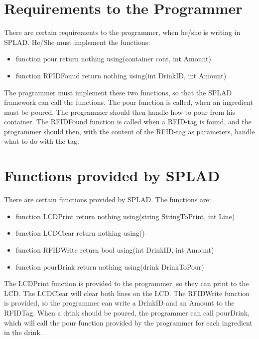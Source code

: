 \section{Requirements to the Programmer}
There are certain requirements to the programmer, when he/she is writing in SPLAD. He/She must implement the functions:
\begin{itemize}
	\item {\color[rgb]{0,0,1}function} pour {\color[rgb]{0,0,1}return} {\color[rgb]{0.545,0.133,0.133}nothing} {\color[rgb]{0,0,1}using}({\color[rgb]{0.545,0.133,0.133}container} cont, {\color[rgb]{0.545,0.133,0.133}int} Amount)
	\item {\color[rgb]{0,0,1}function} RFIDFound {\color[rgb]{0,0,1}return} {\color[rgb]{0.545,0.133,0.133}nothing} {\color[rgb]{0,0,1}using}({\color[rgb]{0.545,0.133,0.133}int} DrinkID, {\color[rgb]{0.545,0.133,0.133}int} Amount)
\end{itemize}
The programmer must implement these two functions, so that the SPLAD framework can call the functions. The pour function is called, when an ingredient must be poured. The programmer should then handle how to pour from his container.
The RFIDFound function is called when a RFID-tag is found, and the programmer should then, with the content of the RFID-tag as parameters, handle what to do with the tag.

\section{Functions provided by SPLAD}
There are certain functions provided by SPLAD. The functions are:
\begin{itemize}
	\item {\color[rgb]{0,0,1}function} LCDPrint {\color[rgb]{0,0,1}return} {\color[rgb]{0.545,0.133,0.133}nothing} {\color[rgb]{0,0,1}using}({\color[rgb]{0.545,0.133,0.133}string} StringToPrint, {\color[rgb]{0.545,0.133,0.133}int} Line)
	\item {\color[rgb]{0,0,1}function} LCDClear {\color[rgb]{0,0,1}return} {\color[rgb]{0.545,0.133,0.133}nothing} {\color[rgb]{0,0,1}using}()
	\item {\color[rgb]{0,0,1}function} RFIDWrite {\color[rgb]{0,0,1}return} {\color[rgb]{0.545,0.133,0.133}bool} {\color[rgb]{0,0,1}using}({\color[rgb]{0.545,0.133,0.133}int} DrinkID, {\color[rgb]{0.545,0.133,0.133}int} Amount)
	\item {\color[rgb]{0,0,1}function} pourDrink {\color[rgb]{0,0,1}return} {\color[rgb]{0.545,0.133,0.133}nothing} {\color[rgb]{0,0,1}using}({\color[rgb]{0.545,0.133,0.133}drink} DrinkToPour)
\end{itemize}
The LCDPrint function is provided to the programmer, so they can print to the LCD. The LCDClear will clear both lines on the LCD. The RFIDWrite function is provided, so the programmer can write a DrinkID and an Amount to the RFIDTag. When a drink should be poured, the programmer can call pourDrink, which will call the pour function provided by the programmer for each ingredient in the drink.